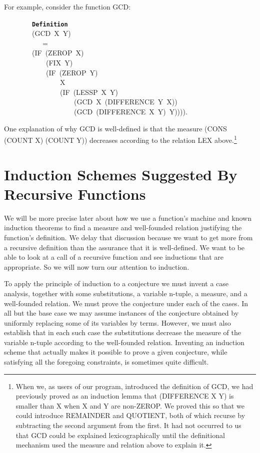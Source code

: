 \documentclass[11pt]{book}
\newenvironment{pubasis}{\begin{flushleft}\ttfamily\small}{\normalsize\rmfamily\end{flushleft}}
\newcommand{\axiomordefinition}[1]{\vspace{6pt}\texttt{\textbf{#1}}}
\newcommand{\pubdefaulttextsize}{\large}
\begin{document}
For example, consider the function GCD:
\begin{pubasis}
~~~~~~~~\axiomordefinition{Definition}\\
~~~~~~~~(GCD~X~Y)\\
~~~~~~~~~~~=\\
~~~~~~~~(IF~(ZEROP~X)\\
~~~~~~~~~~~~(FIX~Y)\\
~~~~~~~~~~~~(IF~(ZEROP~Y)\\
~~~~~~~~~~~~~~~~X\\
~~~~~~~~~~~~~~~~(IF~(LESSP~X~Y)\\
~~~~~~~~~~~~~~~~~~~~(GCD~X~(DIFFERENCE~Y~X))\\
~~~~~~~~~~~~~~~~~~~~(GCD~(DIFFERENCE~X~Y)~Y)))).\\
\end{pubasis}
One explanation of why GCD is well-defined
is that the measure (CONS (COUNT X) (COUNT Y)) decreases according
to the relation LEX above.\footnote{When we, as users of our program, introduced the definition of GCD, we had previously proved as an induction lemma that (DIFFERENCE X Y) is smaller than X when X and Y are non-ZEROP. We proved this so that we could introduce REMAINDER and QUOTIENT, both of which recurse by subtracting the second argument from the first. It had not occurred to us that GCD could be explained lexicographically until the definitional mechanism used the measure and relation above to explain it.}
\section{Induction Schemes Suggested By Recursive Functions}
\pubdefaulttextsize
We will be more precise later about how we use a function's machine
and known induction theorems to find a measure and well-founded relation
justifying the function's definition.
We  delay that discussion because we want to get more
from a recursive definition than
the assurance that it is well-defined.  We want to be able to look at a
call of a recursive function and  see inductions that are
appropriate.  So we will now turn our attention to induction.

To apply the principle of induction to a conjecture we must invent
a case analysis, together with some
substitutions, a variable n-tuple, a measure,
and a well-founded relation.  We must prove the conjecture under each
of the cases.  In all but the base case we may assume instances
of the conjecture obtained by uniformly replacing some of its variables
by terms.  However, we must also establish that in each such case the
substitutions decrease the measure of the variable n-tuple according to the
well-founded relation.  Inventing an induction scheme that actually makes it
possible to prove a given conjecture, while satisfying all the foregoing
constraints, is sometimes quite difficult.
\end{document}

